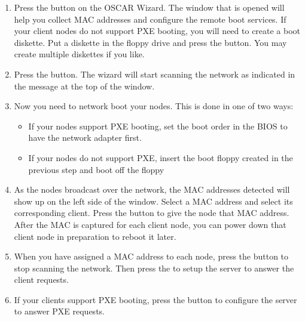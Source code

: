 \begin {enumerate}
  
\item Press the  button on the OSCAR Wizard.
  The window that is opened will help you collect MAC addresses and
  configure the remote boot services. If your client nodes do not
  support PXE booting, you will need to create a boot diskette. Put a
  diskette in the floppy drive and press the  button. You may create multiple diskettes if you like.


\item Press the  button. The wizard will
  start scanning the network as indicated in the message at the top of
  the window.

  
\item Now you need to network boot your nodes. This is done in one of
  two ways:

  \begin{itemize}
  \item If your nodes support PXE booting, set the boot order in the
    BIOS to have the network adapter first.
  \item If your nodes do not support PXE, insert the boot floppy
    created in the previous step and boot off the floppy
  \end{itemize}
        
  
\item As the nodes broadcast over the network, the MAC addresses
  detected will show up on the left side of the window. Select a MAC
  address and select its corresponding client. Press the
   button to give the node that MAC
  address.  After the MAC is captured for each client node, you can
  power down that client node in preparation to reboot it later.


\item When you have assigned a MAC address to each node, press the
   button to stop scanning the network. Then
  press the  to setup the server to
  answer the client requests.


\item If your clients support PXE booting, press the  button to configure the server to answer PXE
  requests.


\end{enumerate}
